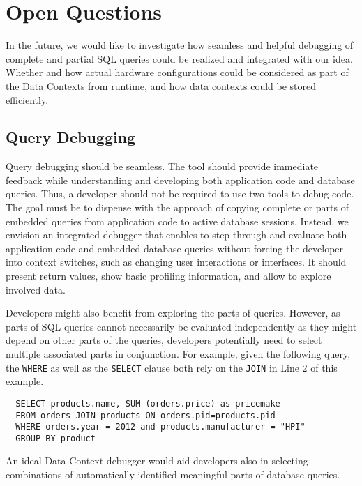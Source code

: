 \section[Open Questions (Author: Lauritz Thamsen)]{Open Questions} \label{sec:OPEN_QUESTIONS}
In the future, we would like to investigate how seamless and helpful debugging of complete and partial SQL queries could be realized and integrated with our idea.
Whether and how actual hardware configurations could be considered as part of the Data Contexts from runtime, and how data contexts could be stored efficiently.

\subsection{Query Debugging}
Query debugging should be seamless.
The tool should provide immediate feedback while understanding and developing both application code and database queries.
Thus, a developer should not be required to use two tools to debug code.
The goal must be to dispense with the approach of copying complete or parts of embedded queries from application code to active database sessions.
Instead, we envision an integrated debugger that enables to step through and evaluate both application code and embedded database queries without forcing the developer into context switches, such as changing user interactions or interfaces.
It should present return values, show basic profiling information, and allow to explore involved data.

Developers might also benefit from exploring the parts of queries.
However, as parts of SQL queries cannot necessarily be evaluated independently as they might depend on other parts of the queries, developers potentially need to select multiple associated parts in conjunction.
For example, given the following query, the \texttt{WHERE} as well as the \texttt{SELECT} clause both rely on the \texttt{JOIN} in Line 2 of this example.
\lstset{language=SQL}
\begin{lstlisting}
  SELECT products.name, SUM (orders.price) as pricemake
  FROM orders JOIN products ON orders.pid=products.pid
  WHERE orders.year = 2012 and products.manufacturer = "HPI"
  GROUP BY product
\end{lstlisting}
An ideal Data Context debugger would aid developers also in selecting combinations of automatically identified meaningful parts of database queries.

